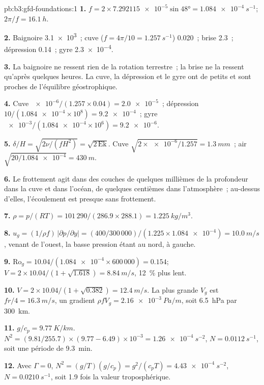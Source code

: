 \begin{solution}{pb:b3:gfd-foundations:1}
\textbf{1.} $f = 2\times\num{7.292115e-5}\sin\ang{48} =
\qty{1.084e-4}{s^{-1}}$; $2\pi/f = \qty{16.1}{h}$.

\textbf{2.} Baignoire \num{3.1e3}~; cuve ($f = 4\pi/10 = \qty{1.257}{s^{-1}}$)
0.020~; brise 2.3~; dépression 0.14~; gyre \num{2.3e-4}.

\textbf{3.} La baignoire ne ressent rien de la rotation terrestre~; la brise
ne la ressent qu'après quelques heures. La cuve, la dépression et le gyre ont
de petits  et sont proches de l'équilibre géostrophique.

\textbf{4.} Cuve $\num{e-6}/(1.257\times0.04) = \num{2.0e-5}$~; dépression
$10/(\num{1.084e-4}\times10^8) = \num{9.2e-4}$~; gyre
$\num{e-3}/(\num{1.084e-4}\times10^6) = \num{9.2e-6}$.

\textbf{5.} $\delta/H = \sqrt{2\nu/(fH^2)} = \sqrt{2\,\mathrm{Ek}}$. Cuve
$\sqrt{2\times\num{e-6}/1.257} = \qty{1.3}{mm}$~; air $\sqrt{20/\num{1.084e-4}}
= \qty{430}{m}$.

\textbf{6.} Le frottement agit dans des couches de quelques millièmes de la profondeur dans la
cuve et dans l'océan, de quelques centièmes dans l'atmosphère~; au-dessus d'elles, l'écoulement
est presque sans frottement.

\textbf{7.} $\rho = p/(RT) = 101\,290/(286.9\times288.1) =
\qty{1.225}{kg/m^3}$.

\textbf{8.} $u_g = (1/\rho f)\,|\partial p/\partial y| = (400/300\,000)/(1.225
\times\num{1.084e-4}) = \qty{10.0}{m/s}$, venant de l'ouest, la basse pression
étant au nord, à gauche.

\textbf{9.} $\mathrm{Ro}_g = 10.04/(\num{1.084e-4}\times600\,000) = 0.154$;
$V = 2\times10.04/(1 + \sqrt{1.618}) = \qty{8.84}{m/s}$, \qty{12}{\percent}
plus lent.

\textbf{10.} $V = 2\times10.04/(1 + \sqrt{0.382}) = \qty{12.4}{m/s}$. La
plus grande $V_g$ est $fr/4 = \qty{16.3}{m/s}$, un gradient $\rho fV_g =
\qty{2.16e-3}{Pa/m}$, soit \qty{6.5}{hPa} par \qty{300}{km}.

\textbf{11.} $g/c_p = \qty{9.77}{K/km}$. $N^2 = (9.81/255.7)\times(9.77 -
6.49)\times10^{-3} = \qty{1.26e-4}{s^{-2}}$, $N = \qty{0.0112}{s^{-1}}$, soit
une période de \qty{9.3}{min}.

\textbf{12.} Avec $\Gamma = 0$, $N^2 = (g/T)(g/c_p) = g^2/(c_pT) =
\qty{4.43e-4}{s^{-2}}$, $N = \qty{0.0210}{s^{-1}}$, soit 1.9 fois la
valeur troposphérique.


\end{solution}
